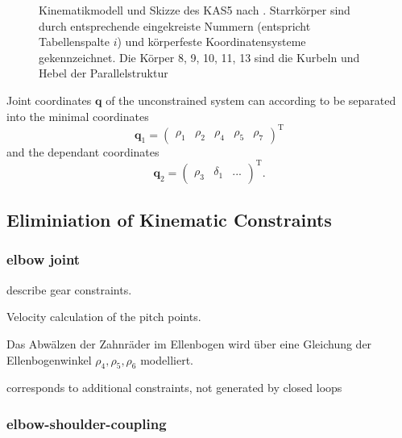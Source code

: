\documentclass[letterpaper, 10 pt, conference]{ieeeconf}  %
\begin{document}
\begin{figure}[htb]
    \tiny
    \begin{minipage}[t]{7.5cm}
        \vspace{0.2cm} %
        
    \end{minipage}

    \caption[Kinematikmodell und Skizze des KAS5]{Kinematikmodell und Skizze des KAS5 nach \cite{KhalilKle1986}. Starrkörper sind durch entsprechende eingekreiste Nummern (entspricht Tabellenspalte \glqq{}$i$\grqq{}) und körperfeste Koordinatensysteme gekennzeichnet. Die Körper 8, 9, 10, 11, 13 sind die Kurbeln und Hebel der Parallelstruktur}
    \label{fig:KAS5_kinematik}
\end{figure}

Joint coordinates $\bm{q}$ of the unconstrained system can according to \cite{NakamuraGho1989} be separated into the  minimal coordinates
%
\begin{equation}
\bm{q}_1=\begin{pmatrix}\rho_1 & \rho_2 & \rho_4 & \rho_5 &\rho_7 \end{pmatrix}^\mathrm{T}
\end{equation}
%
and the dependant coordinates
%
\begin{equation}
\bm{q}_2=\begin{pmatrix}\rho_3 & \delta_1 & ... \end{pmatrix}^\mathrm{T}.
\end{equation}

\subsection{Eliminiation of Kinematic Constraints}


\subsubsection{elbow joint}

describe gear constraints.

Velocity calculation of the pitch points.

Das Abwälzen der Zahnräder im Ellenbogen wird über eine Gleichung der Ellenbogenwinkel $\rho_4,\rho_5,\rho_6$ modelliert.

corresponds to additional constraints, not generated by closed loops

\subsubsection{elbow-shoulder-coupling}
\end{document}
